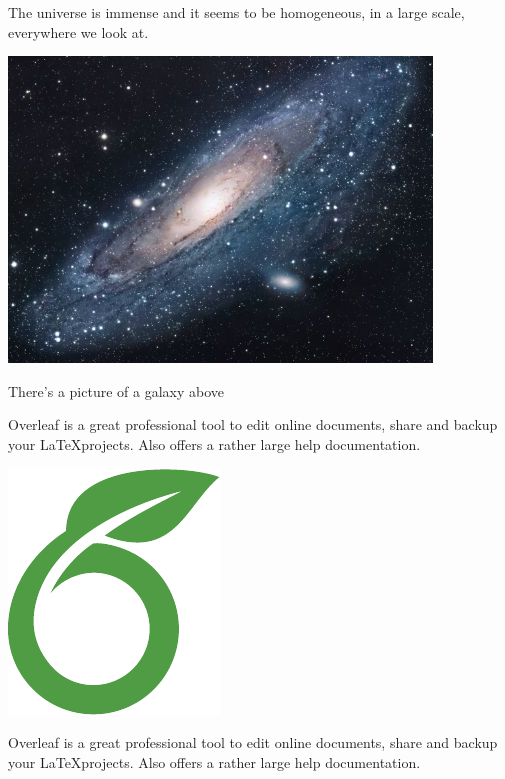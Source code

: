 \documentclass{article}
\begin{document}
The universe is immense and it seems to be homogeneous, in a large scale, everywhere we look at.

\includegraphics{universe}

There's a picture of a galaxy above

\vspace{1.5cm}

Overleaf is a great professional tool to edit online documents, 
share and backup your \LaTeX projects. Also offers a 
rather large help documentation.

\includegraphics[scale=1.5]{overleaf-logo}

\newpage

Overleaf is a great professional tool to edit online documents, 
share and backup your \LaTeX projects. Also offers a 
rather large help documentation.
\end{document}

